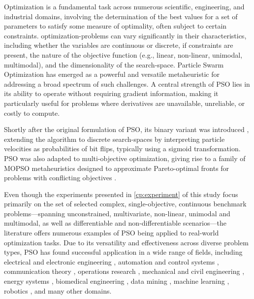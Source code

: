 {Optimization is a fundamental task across numerous scientific, engineering, and industrial domains, involving the determination of the best values for a set of parameters to satisfy some measure of optimality, often subject to certain constraints. \Glspl{optimization-problem}  can vary significantly in their characteristics, including whether the variables are continuous or discrete, if constraints are present, the nature of the objective function (e.g., linear, non-linear, unimodal, multimodal), and the dimensionality of the \gls{search-space}.
Particle Swarm Optimization has emerged as a powerful and versatile \gls{metaheuristic} for addressing a broad spectrum of such challenges. A central strength of PSO lies in its ability to operate without requiring gradient information, making it particularly useful for problems where derivatives are unavailable, unreliable, or costly to compute.

Shortly after the original formulation of PSO, its binary variant was introduced \citep{kennedy1997discrete}, extending  the algorithm to discrete \glspl{search-space} by interpreting particle velocities as probabilities of bit flips, typically using a sigmoid transformation. 
PSO was also adapted to multi-objective optimization, giving rise to a family of MOPSO \glspl{metaheuristic} designed to approximate Pareto-optimal fronts for problems with conflicting objectives \citep{alvarezbenitez2005mopso, nebro2009smpsomcdm, shao2025improved}.


Even though the experiments presented in \autoref{cp:experiment} of this study focus primarily on the set of selected complex, single-objective, continuous benchmark problems—spanning unconstrained, multivariate, non-linear, unimodal and multimodal, as well as differentiable and non-differentiable scenarios---the literature offers numerous examples of PSO being applied to real-world optimization tasks. Due to its versatility and effectiveness across diverse problem types, PSO has found successful application in a wide range of fields, including
electrical and electronic engineering \citep[e.g.,][]{jin2024improved, salvatierra2024pso, dibya2025optimized},
automation and control systems \citep[e.g.,][]{duan2024using,urgan2024pso,gil2024platooning}, 
communication theory \citep[e.g.,][]{qiao2025resource,jin2024overview,jin2025design}, 
operations research \citep[e.g.,][]{li2025ore,omran2025empirical,dong2022optimized, palaniappan2025task, simaiya2024hybrid}, 
mechanical and civil engineering \citep[e.g.,][]{ramkumar2025intelligent,wang2025optimisation,houssein2025recent, hao2025composite}, 
energy systems \citep[e.g.,][]{bade2025multi,zhang2024energy,hamza2024optimization}, 
biomedical engineering \citep[e.g.,][]{mallik2024swarm}, 
data mining \citep[e.g.,][]{shan2024research,zuo2024knowledge,carstensen2025efficient}, 
machine learning \citep[e.g.,][]{alenezi2025hybrid,balavani2024enhanced,tijjani2024enhanced}, 
robotics \citep[e.g.,][]{sharma2025swarm,liu2025design,prakash2024swarm}, 
and many other domains. 





}
